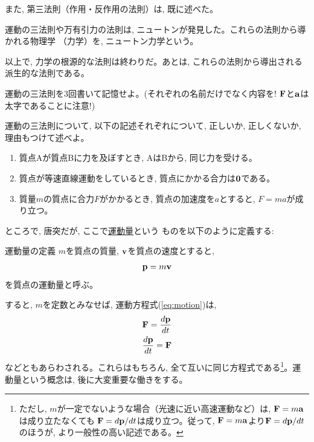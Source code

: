 また, 第三法則（作用・反作用の法則）は, 既に述べた。

運動の三法則や万有引力の法則は, ニュートンが発見した。これらの法則から導かれる物理学
（力学）を, ニュートン力学という。\mv

以上で, 力学の根源的な法則は終わりだ。あとは, これらの法則から導出される派生的な法則である。\mv

\begin{q}\label{q:Newton_3laws}
運動の三法則を3回書いて記憶せよ。(それぞれの名前だけでなく内容を! 
${\bf F}$と${\bf a}$は太字であることに注意!)
\end{q}
\mv

\begin{q}\label{q:NewtonLaw_mistake} 運動の三法則について, 
以下の記述それぞれについて, 正しいか, 正しくないか, 理由もつけて述べよ。
\begin{enumerate}
\item 質点Aが質点Bに力を及ぼすとき, AはBから, 同じ力を受ける。
\item 質点が等速直線運動をしているとき, 質点にかかる合力は${\bf 0}$である。
\item 質量$m$の質点に合力$F$がかかるとき, 質点の加速度を$a$とすると, $F=ma$が成り立つ。
\end{enumerate}
\end{q}



ところで, 唐突だが, ここで\underline{運動量}という
ものを以下のように定義する:
\begin{itembox}{運動量の定義}
$m$を質点の質量, ${\bf v}$を質点の速度とすると, 
\begin{eqnarray}{\bf p}=m{\bf v}\label{eq:def_momentum}\end{eqnarray}
を質点の運動量と呼ぶ。
\end{itembox}

すると, $m$を定数とみなせば, 運動方程式(\ref{eq:motion})は, 
\begin{eqnarray}
{\bf F}=\frac{d{\bf p}}{dt}\\
\frac{d{\bf p}}{dt}={\bf F}
\end{eqnarray}
などともあらわされる。これらはもちろん, 全て互いに同じ方程式である\footnote{ただし, 
$m$が一定でないような場合（光速に近い高速運動など）は, ${\bf F}=m{\bf a}$は成り立たなくても
${\bf F}=d{\bf p}/dt$は成り立つ。従って, ${\bf F}=m{\bf a}$より${\bf F}=d{\bf p}/dt$のほうが, 
より一般性の高い記述である。}。運動量という概念は, 後に大変重要な働きをする。\mv

